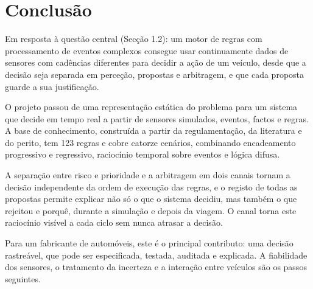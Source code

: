 \chapter{Conclusão}\label{cap:conclusao}

Em resposta à questão central (Secção 1.2): um motor de regras com processamento de eventos complexos consegue usar continuamente dados de sensores com cadências diferentes para decidir a ação de um veículo, desde que a decisão seja separada em perceção, propostas e arbitragem, e que cada proposta guarde a sua justificação.

O projeto passou de uma representação estática do problema para um sistema que decide em tempo real
a partir de sensores simulados, eventos, factos e regras. A base de conhecimento, construída a
partir da regulamentação, da literatura e do perito, tem 123 regras e cobre catorze cenários,
combinando encadeamento progressivo e regressivo, raciocínio temporal sobre eventos e lógica
difusa.

A separação entre risco e prioridade e a arbitragem em dois canais tornam a decisão independente da
ordem de execução das regras, e o registo de todas as propostas permite explicar não só o que o
sistema decidiu, mas também o que rejeitou e porquê, durante a simulação e depois da viagem. O
canal  torna este raciocínio visível a cada ciclo sem nunca atrasar a decisão.

Para um fabricante de automóveis, este é o principal contributo: uma decisão rastreável, que pode
ser especificada, testada, auditada e explicada. A fiabilidade dos sensores, o tratamento da
incerteza e a interação entre veículos são os passos seguintes.
